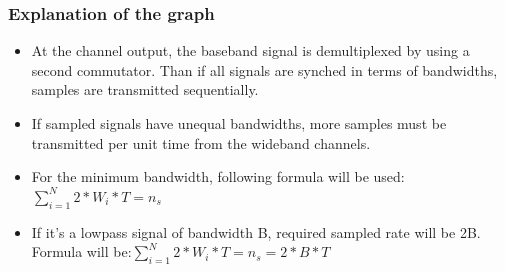 \documentclass{beamer}
\begin{document}
\begin{frame}
\frametitle{Explanation of the graph}
\begin{itemize}
\item	 At the channel output, the baseband signal is demultiplexed by using a second commutator. Than if all signals are synched in terms of bandwidths, samples are transmitted sequentially.
\item If sampled signals have unequal bandwidths, more samples must be transmitted per unit time from the wideband channels.
\item For the minimum bandwidth, following formula will be used:$\sum_{i=1}^{N} 2*W_i*T= n_s$
\item If it's a lowpass signal of bandwidth B, required sampled rate will be 2B. Formula will be:$\sum_{i=1}^{N} 2*W_i*T= n_s=2*B*T$
\end{itemize}
         \end{frame}
\end{document}

